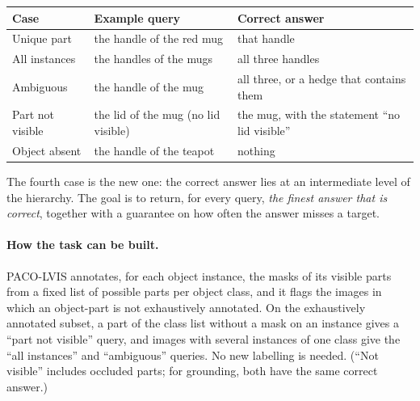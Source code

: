 \documentclass[11pt,a4paper]{article}
\theoremstyle{definition}
\theoremstyle{remark}
\begin{document}
\begin{center}
\begin{tabular}{L{3.3cm}L{5.0cm}L{6.0cm}}
\toprule
Case & Example query & Correct answer \\
\midrule
Unique part & the handle of the red mug & that handle \\
All instances & the handles of the mugs & all three handles \\
Ambiguous & the handle of the mug & all three, or a hedge that contains them \\
Part not visible & the lid of the mug (no lid visible) & the mug, with the statement ``no lid visible'' \\
Object absent & the handle of the teapot & nothing \\
\bottomrule
\end{tabular}
\end{center}

\noindent The fourth case is the new one: the correct answer lies at an intermediate level of the hierarchy. The
goal is to return, for every query, \emph{the finest answer that is correct}, together with a guarantee on how often
the answer misses a target.

\paragraph{How the task can be built.} PACO-LVIS \cite{paco} annotates, for each object instance, the masks of its
visible parts from a fixed list of possible parts per object class, and it flags the images in which an object-part
is not exhaustively annotated. On the exhaustively annotated subset, a part of the class list without a mask on an
instance gives a ``part not visible'' query, and images with several instances of one class give the ``all
instances'' and ``ambiguous'' queries. No new labelling is needed. (``Not visible'' includes occluded parts; for
grounding, both have the same correct answer.)

\end{document}
